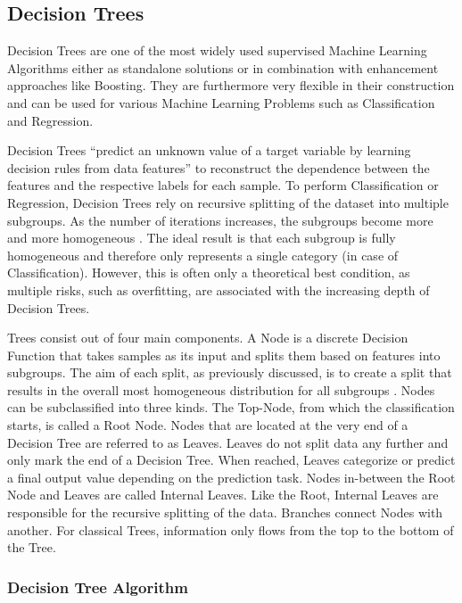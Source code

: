 \subsection{Decision Trees}

Decision Trees are one of the most widely used supervised Machine Learning Algorithms either 
as standalone solutions or in combination with enhancement approaches like Boosting. They are 
furthermore very flexible in their construction and can be used for various Machine Learning 
Problems such as Classification and Regression. 

Decision Trees “predict an unknown value of a target variable by learning decision rules from 
data features” to reconstruct the dependence between the features and the respective labels for 
each sample. To perform Classification or Regression, Decision Trees rely on recursive 
splitting of the dataset into multiple subgroups. As the number of iterations increases, the 
subgroups become more and more homogeneous \cite[p.330]{James2021}. The ideal result is that each subgroup is fully 
homogeneous and therefore only represents a single category (in case of Classification). However, 
this is often only a theoretical best condition, as multiple risks, such as overfitting, are 
associated with the increasing depth of Decision Trees.

Trees consist out of four main components. A Node is a discrete Decision Function that takes 
samples as its input and splits them based on features into subgroups. The aim of each split, 
as previously discussed, is to create a split that results in the overall most homogeneous 
distribution for all subgroups \cite[p.6]{lewis2000introduction}. Nodes can be subclassified into three kinds. The Top-Node, 
from which the classification starts, is called a Root Node. Nodes that are located at the 
very end of a Decision Tree are referred to as Leaves. Leaves do not split data any further and 
only mark the end of a Decision Tree. When reached, Leaves categorize or predict a final output 
value depending on the prediction task. Nodes in-between the Root Node and Leaves are called 
Internal Leaves. Like the Root, Internal Leaves are responsible for the recursive splitting of 
the data. Branches connect Nodes with another. For classical Trees, information only flows from 
the top to the bottom of the Tree. 

\subsubsection{Decision Tree Algorithm}

